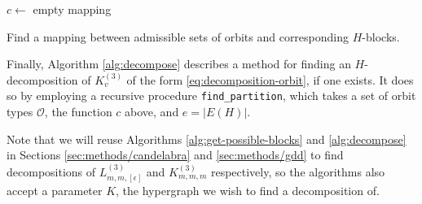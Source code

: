 \begin{algorithm}

$c \gets$ empty mapping\;
\;

\caption{Find a mapping between admissible sets of orbits and corresponding $H$-blocks.} \label{alg:get-possible-blocks}
\end{algorithm}

Finally, Algorithm \ref{alg:decompose} describes a method for finding an $H$-decomposition of $K_{v}^{(3)}$ of the form \eqref{eq:decomposition-orbit}, if one exists. It does so by employing a recursive procedure {\tt find\_partition}, which takes a set of orbit types $\mathcal{O}$, the function $c$ above, and $e = |E(H)|$.

Note that we will reuse Algorithms \ref{alg:get-possible-blocks} and \ref{alg:decompose} in Sections \ref{sec:methods/candelabra} and \ref{sec:methods/gdd} to find decompositions of $L_{m,m,[\epsilon]}^{(3)}$ and $K_{m,m,m}^{(3)}$ respectively, so the algorithms also accept a parameter $K$, the hypergraph we wish to find a decomposition of.

